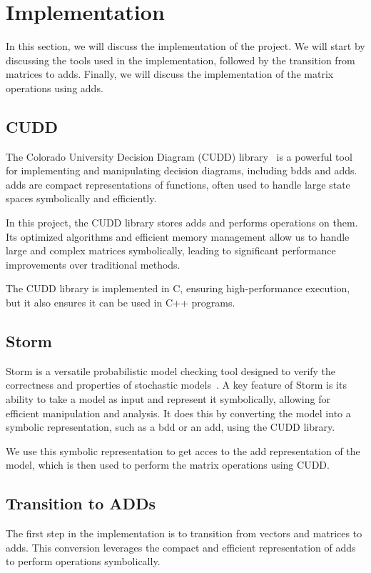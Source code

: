 \section{Implementation}\label{sec:implementation}
In this section, we will discuss the implementation of the project. 
We will start by discussing the tools used in the implementation, followed by the transition from matrices to \glspl{add}. 
Finally, we will discuss the implementation of the matrix operations using \glspl{add}.


\subsection{CUDD}
The Colorado University Decision Diagram (CUDD) library~\cite{somenzi1997cudd} is a powerful tool for implementing and manipulating decision diagrams, including \glspl{bdd} and \glspl{add}. \glspl{add} are compact representations of functions, often used to handle large state spaces symbolically and efficiently.

In this project, the CUDD library stores \glspl{add} and performs operations on them. Its optimized algorithms and efficient memory management allow us to handle large and complex matrices symbolically, leading to significant performance improvements over traditional methods.

The CUDD library is implemented in C, ensuring high-performance execution, but it also ensures it can be used in C++ programs. 

\subsection{Storm}
Storm is a versatile probabilistic model checking tool designed to verify the correctness and properties of stochastic models~\cite{hensel2021probabilistic}. 
A key feature of Storm is its ability to take a model as input and represent it symbolically, allowing for efficient manipulation and analysis. 
It does this by converting the model into a symbolic representation, such as a \gls{bdd} or an \gls{add}, using the CUDD library.

We use this symbolic representation to get acces to the \gls{add} representation of the model, which is then used to perform the matrix operations using CUDD.

\subsection{Transition to ADDs}
The first step in the implementation is to transition from vectors and matrices to \glspl{add}. 
This conversion leverages the compact and efficient representation of \glspl{add} to perform operations symbolically.

